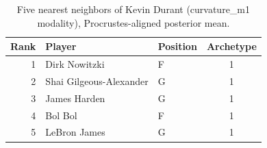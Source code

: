 \begin{table}[htbp]
  \centering\small
  \begin{tabular}{rllc}
    \toprule
    Rank & Player & Position & Archetype \\
    \midrule
    1 & Dirk Nowitzki & F & 1 \\
    2 & Shai Gilgeous-Alexander & G & 1 \\
    3 & James Harden & G & 1 \\
    4 & Bol Bol & F & 1 \\
    5 & LeBron James & G & 1 \\
    \bottomrule
  \end{tabular}
  \caption{Five nearest neighbors of Kevin Durant (curvature_m1 modality), Procrustes-aligned posterior mean.}
  \label{tab:Kevin_Durant_neighbors_curvature_m1}
\end{table}

